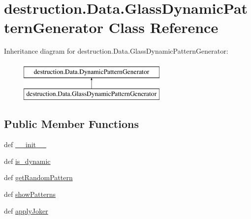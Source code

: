 \hypertarget{classdestruction_1_1_data_1_1_glass_dynamic_pattern_generator}{\section{destruction.\-Data.\-Glass\-Dynamic\-Pattern\-Generator Class Reference}
\label{classdestruction_1_1_data_1_1_glass_dynamic_pattern_generator}
}
Inheritance diagram for destruction.\-Data.\-Glass\-Dynamic\-Pattern\-Generator\-:\begin{figure}[H]
\begin{center}
\leavevmode
\includegraphics[height=2.000000cm]{classdestruction_1_1_data_1_1_glass_dynamic_pattern_generator}
\end{center}
\end{figure}
\subsection*{Public Member Functions}
\begin{DoxyCompactItemize}
\item 
def \hyperlink{classdestruction_1_1_data_1_1_glass_dynamic_pattern_generator_a21de3d96228652c122a5bfadd778252c}{\-\_\-\-\_\-init\-\_\-\-\_\-}
\item 
def \hyperlink{classdestruction_1_1_data_1_1_glass_dynamic_pattern_generator_aa24e220c99c178d9c554ec684ab82fb8}{is\-\_\-dynamic}
\item 
def \hyperlink{classdestruction_1_1_data_1_1_glass_dynamic_pattern_generator_a7ecd1b4c738e30ca3b4233461ef2404c}{get\-Random\-Pattern}
\item 
def \hyperlink{classdestruction_1_1_data_1_1_glass_dynamic_pattern_generator_ab3320d524033d3f29cee43b62e63d66e}{show\-Patterns}
\item 
def \hyperlink{classdestruction_1_1_data_1_1_glass_dynamic_pattern_generator_ac55854cb9e9c65a511f91c96dbfaf165}{apply\-Joker}
\end{DoxyCompactItemize}
